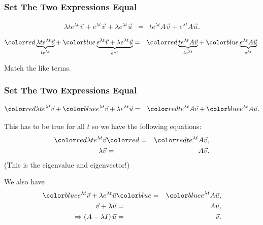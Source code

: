 \begin{frame}
  \frametitle{Set The Two Expressions Equal}

  {
    \begin{eqnarray*}
      \lambda t e^{\lambda t} \vec{v} + e^{\lambda t} \vec{v} + \lambda e^{\lambda t} \vec{u}
      & = & 
      t e^{\lambda t} A \vec{v} + e^{\lambda t} A \vec{u}.
    \end{eqnarray*}
  }

  {
    \begin{eqnarray*}
      \redText{\underbrace{\lambda t e^{\lambda t} \vec{v}}_ {te^{\lambda t}}} +  
      \blueText{\underbrace{e^{\lambda t} \vec{v} + \lambda e^{\lambda t} \vec{u}}_{e^{\lambda t}}}
      & = & 
      \redText{\underbrace{t e^{\lambda t} A \vec{v}}_{t e^{\lambda t}}} + 
      \blueText{\underbrace{e^{\lambda t} A \vec{u}}_{e^{\lambda t}}}.
    \end{eqnarray*}

    Match the like terms.

  }
  

\end{frame}

\begin{frame}
  \frametitle{Set The Two Expressions Equal}

    \begin{eqnarray*}
      \redText{\lambda t e^{\lambda t} \vec{v}} + \blueText{e^{\lambda t} \vec{v} + \lambda e^{\lambda t} \vec{u}}
      & = & 
      \redText{t e^{\lambda t} A \vec{v}} + \blueText{e^{\lambda t} A \vec{u}}.
    \end{eqnarray*}
  
    This has to be true for all $t$ so we have the following equations:
    \begin{eqnarray*}
      \redText{\lambda t e^{\lambda t} \vec{v}} & \redText{=} & \redText{t e^{\lambda t} A \vec{v}}, \\
      \lambda \vec{v} & = & A \vec{v}.
    \end{eqnarray*}
    (This is the eigenvalue and eigenvector!)

    We also have 
    \begin{eqnarray*}
      \blueText{e^{\lambda t} \vec{v} + \lambda e^{\lambda t} \vec{u}} & \blueText{=} & \blueText{e^{\lambda t} A \vec{u}} , \\
      \vec{v} + \lambda \vec{u} & = &  A \vec{u}, \\
      \Rightarrow \lp A - \lambda I \rp \vec{u} & = & \vec{v}.
    \end{eqnarray*}

\end{frame}


